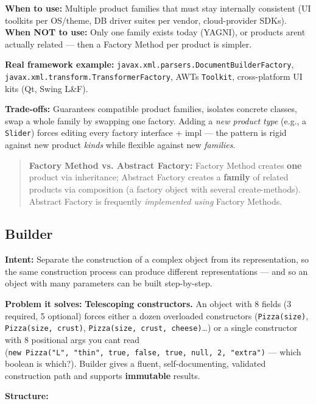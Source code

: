 \documentclass[11pt]{article}
\begin{document}
\textbf{When to use:} Multiple product families that must stay internally consistent (UI toolkits per OS/theme, DB driver suites per vendor, cloud-provider SDKs). \textbf{When NOT to use:} Only one family exists today (YAGNI), or products aren\textquotesingle t actually related --- then a Factory Method per product is simpler.

\textbf{Real framework example:} \texttt{javax.xml.parsers.DocumentBuilderFactory}, \texttt{javax.xml.transform.TransformerFactory}, AWT\textquotesingle s \texttt{Toolkit}, cross-platform UI kits (Qt, Swing L\&F).

\textbf{Trade-offs:} Guarantees compatible product families, isolates concrete classes, swap a whole family by swapping one factory. Adding a \emph{new product type} (e.g., a \texttt{Slider}) forces editing every factory interface + impl --- the pattern is rigid against new product \emph{kinds} while flexible against new \emph{families}.

\begin{quote}
\textbf{Factory Method vs. Abstract Factory:} Factory Method creates \textbf{one} product via inheritance; Abstract Factory creates a \textbf{family} of related products via composition (a factory object with several create-methods). Abstract Factory is frequently \emph{implemented using} Factory Methods.
\end{quote}

\subsection{Builder}\label{builder}

\textbf{Intent:} Separate the construction of a complex object from its representation, so the same construction process can produce different representations --- and so an object with many parameters can be built step-by-step.

\textbf{Problem it solves:} \textbf{Telescoping constructors.} An object with 8 fields (3 required, 5 optional) forces either a dozen overloaded constructors (\texttt{Pizza(size)}, \texttt{Pizza(size,\ crust)}, \texttt{Pizza(size,\ crust,\ cheese)}\ldots) or a single constructor with 8 positional args you can\textquotesingle t read (\texttt{new\ Pizza("L",\ "thin",\ true,\ false,\ true,\ null,\ 2,\ "extra")} --- which boolean is which?). Builder gives a fluent, self-documenting, validated construction path and supports \textbf{immutable} results.

\textbf{Structure:}
\end{document}
